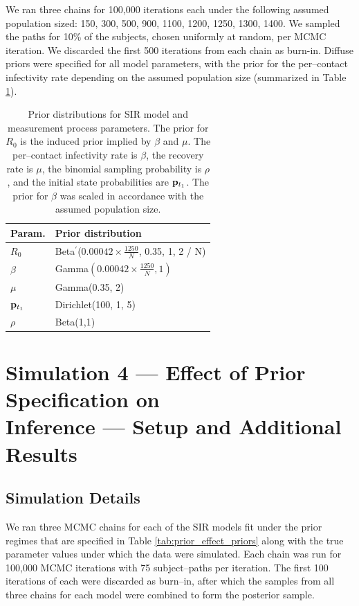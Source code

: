We ran three chains for 100,000 iterations each under the following assumed population sized: 150, 300, 500, 900, 1100, 1200, 1250, 1300, 1400. We sampled the paths for 10\% of the subjects, chosen uniformly at random, per MCMC iteration. We discarded the first 500 iterations from each chain as burn-in. Diffuse priors were specified for all model parameters, with the prior for the per--contact infectivity rate depending on the assumed population size (summarized in Table \ref{tab:popsize_misspec_priors}).

\begin{table}[htbp]
	\centering
	\begin{tabular}{ll}
		\hline
		Param. & Prior distribution \\ 
		\hline
		$ R_0 $ &  Beta$ ^\prime $($ 0.00042 \times \frac{1250}{N} $, 0.35, 1, 2 / N) \\
		$ \beta $ &  Gamma$ (0.00042 \times \frac{1250}{N}, 1) $ \\ 
		$ \mu $ & Gamma(0.35, 2)  \\ 
		$ \mathbf{p}_{t_1} $ & Dirichlet(100, 1, 5)  \\ 
		$ \rho $ & Beta(1,1) \\
		\hline
	\end{tabular}
	\caption[Simulation 3 SIR model priors.]{Prior distributions for SIR model and measurement process parameters. The prior for $ R_0 $ is the induced prior implied by $ \beta $ and $ \mu $. The per--contact infectivity rate is $ \beta $, the recovery rate is $ \mu $, the binomial sampling probability is $ \rho $, and the initial state probabilities are $ \mathbf{p}_{t_1} $. The prior for $ \beta $ was scaled in accordance with the assumed population size.}
	\label{tab:popsize_misspec_priors}
\end{table}

\newpage

\section{Simulation 4 --- Effect of Prior Specification on\\ Inference --- Setup and Additional Results}
\label{sec:prior_effect_details}
\subsection{Simulation Details}
We ran three MCMC chains for each of the SIR models fit under the prior regimes that are specified in Table \ref{tab:prior_effect_priors} along with the true parameter values under which the data were simulated. Each chain was run for 100,000 MCMC iterations  with 75 subject--paths per iteration. The first 100 iterations of each were discarded as burn--in, after which the samples from all three chains for each model were combined to form the posterior sample.

